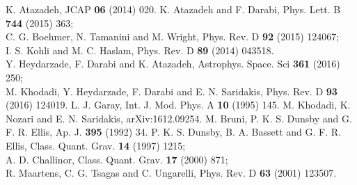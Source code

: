 \documentclass[showpacs,amsmath,nofootinbib,amssymb,epsfig]{revtex4}
\begin{document}
\begin{thebibliography}{}
K. Atazadeh, JCAP \textbf{06} (2014) 020.
K. Atazadeh and F. Darabi, Phys. Lett. B \textbf{744} (2015) 363;\\ C. G. Boehmer, N. Tamanini and M. Wright, Phys. Rev. D \textbf{92} (2015) 124067;\\I. S. Kohli and M. C. Haslam, Phys. Rev. D  \textbf{89} (2014) 043518.
\\ Y. Heydarzade, F. Darabi and K. Atazadeh, Astrophys. Space. Sci \textbf{361} (2016) 250;\\ M. Khodadi, Y. Heydarzade, F. Darabi and E. N. Saridakis, Phys. Rev. D \textbf{93} (2016) 124019.
 L. J. Garay, Int. J. Mod. Phys. A {\bf 10} (1995) 145.
M. Khodadi, K. Nozari and E. N. Saridakis, arXiv:1612.09254.
M. Bruni, P. K. S. Dunsby and G. F. R. Ellis, Ap. J. \textbf{395} (1992) 34.
P. K. S. Dunsby, B. A. Bassett and G. F. R. Ellis, Class.
Quant. Grav. \textbf{14} (1997) 1215;\\ A. D. Challinor, Class.
Quant. Grav. \textbf{17} (2000) 871; \\R. Maartens, C. G.
Tsagas and C. Ungarelli, Phys. Rev. D \textbf{63} (2001) 123507.
\end{thebibliography}
\end{document}
